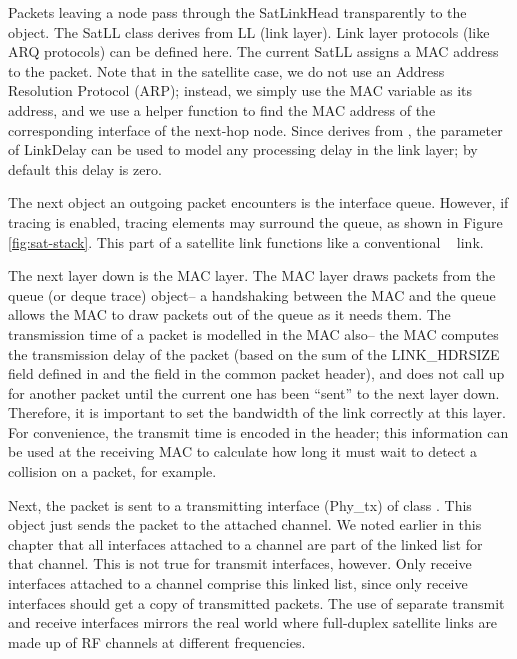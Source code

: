Packets leaving a node pass through the SatLinkHead transparently to the 
 object.  The SatLL class derives from LL (link layer).
Link layer protocols (like ARQ protocols) can be defined here.  The current
SatLL assigns a MAC address to the packet.  Note that in the satellite case,
we do not use an Address Resolution Protocol (ARP); instead, we simply use
the MAC  variable as its address, and we use a helper function
to find the MAC address of the corresponding interface of the next-hop node.  
Since  derives from , the 
parameter of LinkDelay can be used to model any processing delay in the
link layer; by default this delay is zero.

The next object an outgoing packet encounters is the interface queue.  
However, if tracing is enabled, tracing elements may surround the
queue, as shown in Figure \ref{fig:sat-stack}.  This part of a satellite
link functions like a conventional \ns~ link.

The next layer down is the MAC layer.  The MAC layer draws packets from
the queue (or deque trace) object-- a handshaking between the MAC and the 
queue allows the MAC to draw packets out of the queue as it needs them.  The
transmission time of a packet is modelled in the MAC also-- the MAC computes
the transmission delay of the packet (based on the sum of the 
LINK\_HDRSIZE field defined in  and the  field 
in the common packet header), and does not call up for another packet until
the current one has been ``sent'' to the next layer down.  Therefore, it
is important to set the bandwidth of the link correctly at this layer.
For convenience, the transmit time is encoded in the  header; this
information can be used at the receiving MAC to calculate how long it must
wait to detect a collision on a packet, for example.

Next, the packet is sent to a transmitting interface (Phy\_tx) of class 
.  This
object just sends the packet to the attached channel.  We noted earlier
in this chapter that all interfaces attached to a channel are part of the
linked list for that channel.  This is not true for transmit interfaces,
however.  Only receive interfaces attached to a channel comprise this linked
list, since only receive interfaces should get a copy of transmitted packets.
The use of separate transmit and receive interfaces mirrors the real world
where full-duplex satellite links are made up of RF channels at different
frequencies.

